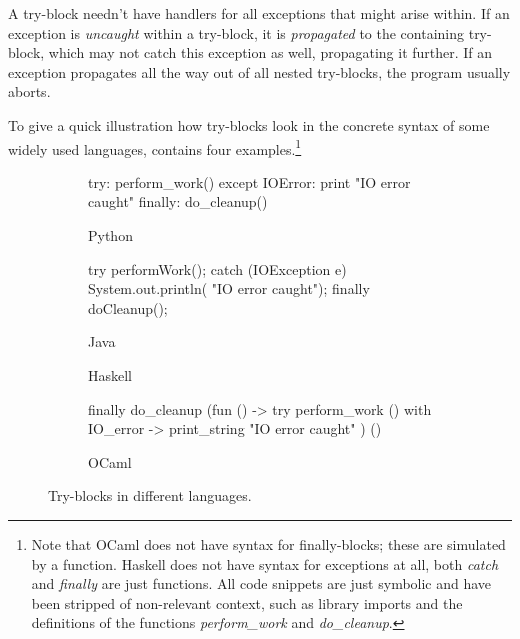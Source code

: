 A try-block needn't have handlers for all exceptions that might arise within. If an exception
is \emph{uncaught} within a try-block, it is \emph{propagated} to the containing try-block,
which may not catch this exception as well, propagating it further.
If an exception propagates all the way out of all nested try-blocks, the program usually
aborts.

To give a quick illustration how try-blocks look in the concrete syntax of some widely used
languages,  contains four examples.\footnote{Note that OCaml does not
have syntax for finally-blocks; these are simulated by a function. Haskell does not have
syntax for exceptions at all, both \emph{catch} and \emph{finally} are just functions.
All code snippets are just symbolic and have been stripped of non-relevant context, such
as library imports and the definitions of the functions \emph{perform\_work}
and \emph{do\_cleanup}.}

\begin{figure}
\centering
%
\begin{subfigure}[b]{0.46\textwidth}\begin{codepy}
try:
	perform_work()
except IOError:
	print "IO error caught"
finally:
	do_cleanup()
\end{codepy}\caption{Python}\end{subfigure}
%
\begin{subfigure}[b]{0.46\textwidth}\begin{codejava}
try {
	performWork();
} catch (IOException e) {
	System.out.println(
	    "IO error caught");
} finally {
	doCleanup();
}
\end{codejava}\caption{Java}\end{subfigure}

\begin{subfigure}[b]{0.46\textwidth}\caption{Haskell}\end{subfigure}
%
\begin{subfigure}[b]{0.46\textwidth}\begin{codeml}
finally do_cleanup (fun () ->
  try perform_work ()
  with IO_error ->
    print_string "IO error caught"
) ()
\end{codeml}\caption{OCaml}\end{subfigure}
\caption{Try-blocks in different languages.}
\label{fig:try-blocks}
\end{figure}

